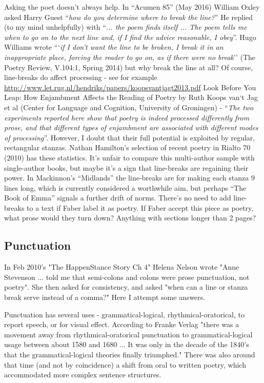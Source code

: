\documentclass[11pt]{article}
\begin{document}
Asking the poet doesn't always help. In ``Acumen 85'' (May 2016) William Oxley asked Harry Guest ``\textit{how do you determine where to break the line?}'' He replied (to my mind unhelpfully) with ``\textit{... the poem finds itself ... The poem tells me when to go on to the next line and, if I find the advice reasonable, I obey}''. Hugo Williams wrote ```\textit{if I don't want the line to be broken, I break it in an inappropriate place, forcing the reader to go on, as if there were no break}'' (The Poetry Review,  V.104:1, Spring 2014) but why break the line at all? Of course, line-breaks do affect processing - see for example \url{http://www.let.rug.nl/hendriks/papers/koopsvantjagt2013.pdf} Look Before You Leap: How Enjambment Affects the Reading of Poetry by Ruth Koops van‘t Jag et al (Center for Language and Cognition, University of Groningen) - ``\textit{The two experiments reported here show that poetry is indeed processed differently from prose, and that different types of enjambment are associated with different modes of processing}''. However, I doubt that their full potential is exploited by regular, rectangular stanzas. Nathan Hamilton's selection of recent poetry in Rialto 70 (2010) has these statistics. It's unfair to compare this multi-author sample with single-author books, but maybe it's a sign that line-breaks are  regaining their power. In Mackinnon's ``Midlands'' the line-breaks are for making each stanza 9 lines long, which is currently considered a worthwhile aim, but perhaps ``The Book of Emma'' signals a further drift of norms. There's no need to add line-breaks to a text if Faber label it as poetry. If Faber accept this piece as poetry, what prose would they turn down? Anything with sections longer than 2 pages?  


\newpage\subsection{Punctuation}
In Feb 2010's "The HappenStance Story Ch 4" Helena Nelson wrote "Anne Stevenson
  ... told me that semi-colons and colons were prose punctuation, not poetry". She then asked for consistency, and asked "when can a line or stanza break serve instead of a comma?" Here I attempt some answers.

Punctuation has several uses  - grammatical-logical, rhythmical-oratorical, to report speech, or for visual effect. According to Franke Verlag "there was a movement away from rhythmical-oratorical punctuation to grammatical-logical usage between about 1580 and 1680 ... It was only in the decade of the 1840's that the
grammatical-logical theories finally triumphed."  There was also around that time (and not by coincidence) a shift from oral to written poetry, which accommodated more complex sentence structures.
\end{document}
